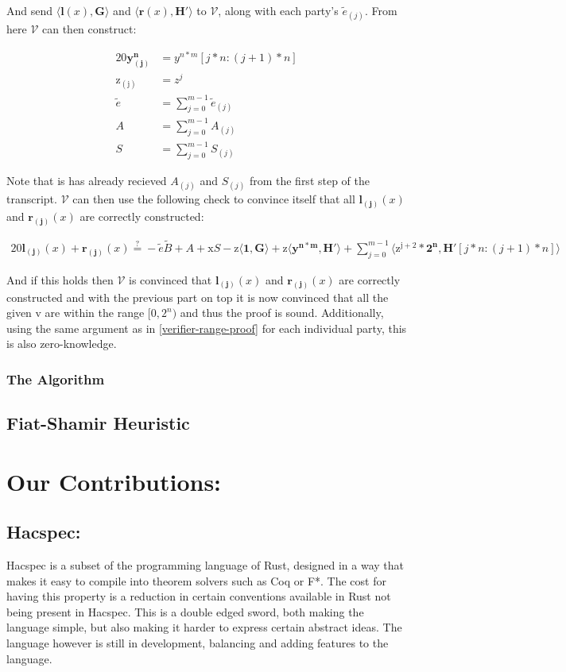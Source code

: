 \documentclass{article}
\newcommand{\eq}[1]{\begin{alignat*}{20}#1\end{alignat*}}
\renewcommand{\vec}[1]{\boldsymbol{#1}}
\newcommand{\ran}[1]{\mathrm{#1}}
\newcommand{\vecran}[1]{\mathbf{#1}}
\newcommand{\V}{\mathcal{V}}
\newcommand{\dotp}[2]{\langle #1, #2 \rangle}
\begin{document}
And send $\dotp{\vec{l}(x)}{\vec{G}}$ and $\dotp{\vec{r}(x)}{\vec{H'}}$ to $\V$, along with each party's $\widetilde{e}_{(j)}$. From here $\V$ can then construct:

\eq{
	\vecran{y^n_{(j)}} &= y^{n*m}[j*n : (j+1)*n]\\
	\ran{z_{(j)}} &= z^j\\
	\widetilde{e} &= \sum^{m-1}_{j = 0} \widetilde{e}_{(j)}\\
	A &= \sum^{m-1}_{j = 0} A_{(j)}\\
	S &= \sum^{m-1}_{j = 0} S_{(j)}
}

Note that is has already recieved $A_{(j)}$ and $S_{(j)}$ from the first step of the transcript. $\V$ can then use the following check to convince itself that all $\vec{l_{(j)}}(x)$ and $\vec{r_{(j)}}(x)$ are correctly constructed:

\eq{
	\vec{l_{(j)}}(x) + \vec{r_{(j)}}(x) \stackrel{?}{=} -\widetilde{e}\widetilde{B} + A + \ran{x}S - \ran{z}\dotp{\vec{1}}{\vec{G}} + \ran{z}\dotp{\vecran{y^{n*m}}}{\vec{H'}} + \sum^{m-1}_{j = 0}\dotp{\ran{z^{j+2}}*\vec{2^n}}{\vec{H'}[j*n: (j+1)*n]}
}

And if this holds then $\V$ is convinced that $\vec{l_{(j)}}(x)$ and $\vec{r_{(j)}}(x)$ are correctly constructed and with the previous part on top it is now convinced that all the given v are within the range $[0,2^n)$ and thus the proof is sound. Additionally, using the same argument as in \ref{verifier-range-proof} for each individual party, this is also zero-knowledge.

\subsubsection{The Algorithm}

\subsection{Fiat-Shamir Heuristic}\label{fiat-shamir-heuristic}

\section{Our Contributions:}

\subsection{Hacspec:} \label{Hacspec}

Hacspec is a subset of the programming language of Rust, designed in a
way that makes it easy to compile into theorem solvers such as Coq or F*.
The cost for having this property is a reduction in certain conventions
available in Rust not being present in Hacspec. This is a double edged
sword, both making the language simple, but also making it harder to
express certain abstract ideas. The language however is still in
development, balancing and adding features to the language.
\end{document}
